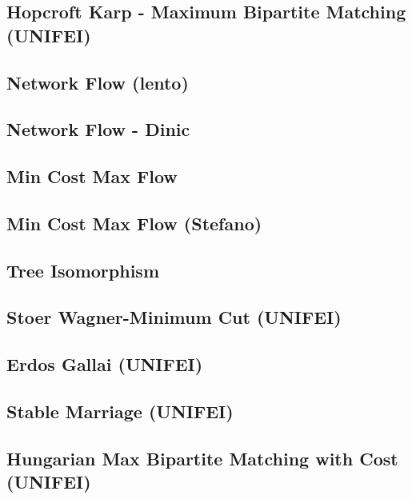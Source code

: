 \subsection{Hopcroft Karp - Maximum Bipartite Matching (UNIFEI)}
\raggedbottom
\hrulefill
\subsection{Network Flow (lento)}
\raggedbottom
\hrulefill
\subsection{Network Flow - Dinic}
\raggedbottom
\hrulefill
\subsection{Min Cost Max Flow}
\raggedbottom
\hrulefill
\subsection{Min Cost Max Flow (Stefano)}
\raggedbottom
\hrulefill
\subsection{Tree Isomorphism}
\raggedbottom
\hrulefill
\subsection{Stoer Wagner-Minimum Cut (UNIFEI)}
\raggedbottom
\hrulefill
\subsection{Erdos Gallai (UNIFEI)}
\raggedbottom
\hrulefill
\subsection{Stable Marriage (UNIFEI)}
\raggedbottom
\hrulefill
\subsection{Hungarian Max Bipartite Matching with Cost (UNIFEI)}
\raggedbottom
\hrulefill
